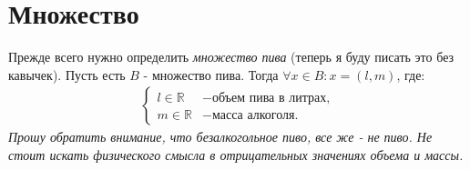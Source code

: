 \section*{Множество}
Прежде всего нужно определить \textit{множество пива} (теперь я буду писать это без кавычек).
Пусть есть $B$ - множество пива. Тогда $\forall x \in B: x = (l, m)$, где:
\begin{align}
  \begin{cases}
    l \in \mathbb{R} & - \text{объем пива в литрах,} \\
    m \in \mathbb{R} & - \text{масса алкоголя.}
  \end{cases}
  \label{set_def}
\end{align}
\textit{Прошу обратить внимание, что безалкогольное пиво, все же - не пиво. Не стоит искать физического смысла в отрицательных значениях объема и массы.}